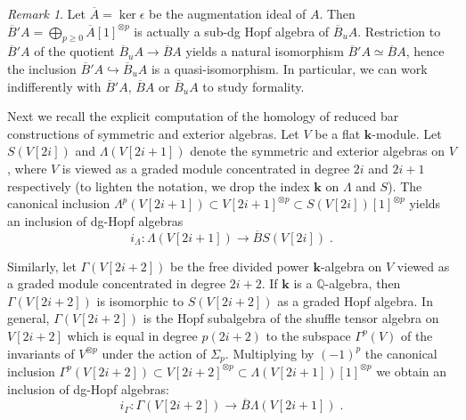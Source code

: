 \documentclass{amsart}
\theoremstyle{definition}
\theoremstyle{remark}
\newtheorem{remark}[formula]{Remark}
\newcommand{\Q}{\mathbb Q}
\renewcommand{\ge}{\geqslant}
\def\k{\mathbf{k}}
\begin{document}
\begin{remark}\label{rem:reducednormalized}
	Let $\overline{A}=\ker \epsilon$ be the augmentation ideal of $A$.
	Then $\overline{B}'A=\bigoplus_{p\ge 0} \overline{A}[1]^{\otimes p}$ is actually a sub-dg Hopf algebra of $\overline{B}_uA$. Restriction to $\overline{B}'A$ of the quotient $\overline{B}_uA\to \overline{B}A$ yields a natural isomorphism $\overline{B}'A\simeq \overline{B}A$, hence the inclusion $\overline{B}'A\hookrightarrow \overline{B}_uA$ is a quasi-isomorphism.
	In particular, we can work indifferently with $\overline{B}'A$, $\overline{B}A$ or $\overline{B}_uA$ to study formality.
\end{remark}

Next we recall the explicit computation of the homology of reduced bar constructions of symmetric and exterior algebras. 
Let $V$ be a flat $\k$-module. 
Let $S(V[2i])$ and $\Lambda(V[2i+1])$ denote the symmetric and exterior algebras on $V$, where $V$ is viewed as a graded module concentrated in degree $2i$ and $2i+1$ respectively (to lighten the notation, we drop the index $\k$ on $\Lambda$ and $S$).
The canonical inclusion $\Lambda^p(V[2i+1])\subset V[2i+1]^{\otimes p}\subset S(V[2i])[1]^{\otimes p}$ yields an inclusion of dg-Hopf algebras 
$$i_{\Lambda}:\Lambda(V[2i+1])\to \overline{B}S(V[2i])\;.$$

Similarly, let $\Gamma(V[2i+2])$ be the free divided power $\k$-algebra on $V$ viewed as a graded module concentrated in degree $2i+2$. If $\k$ is a $\Q$-algebra, then $\Gamma(V[2i+2])$ is isomorphic to $S(V[2i+2])$ as a graded Hopf algebra. In general, $\Gamma(V[2i+2])$ is the Hopf subalgebra of the shuffle tensor algebra on $V[2i+2]$ which is equal in degree $p(2i+2)$ to the subspace $\Gamma^p(V)$ of the invariants of $V^{\otimes p}$ under the action of $\Sigma_p$.  Multiplying by $(-1)^p$ the canonical inclusion $\Gamma^p(V[2i+2])\subset V[2i+2]^{\otimes p}\subset \Lambda(V[2i+1])[1]^{\otimes p}$ we obtain an inclusion of dg-Hopf algebras:
$$i_{\Gamma}:\Gamma(V[2i+2])\to \overline{B}\Lambda(V[2i+1])\;.$$
\end{document}
